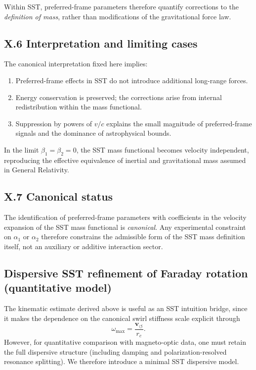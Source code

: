 \documentclass[10pt]{article}
\begin{document}
        Within SST, preferred-frame parameters therefore quantify corrections to the
        \emph{definition of mass}, rather than modifications of the gravitational
        force law.

    \subsection*{X.6 Interpretation and limiting cases}

        The canonical interpretation fixed here implies:
        \begin{enumerate}
            \item Preferred-frame effects in SST do not introduce additional long-range
            forces.
            \item Energy conservation is preserved; the corrections arise from internal
            redistribution within the mass functional.
            \item Suppression by powers of $v/c$ explains the small magnitude of
            preferred-frame signals and the dominance of astrophysical bounds.
        \end{enumerate}

        In the limit $\beta_1 = \beta_2 = 0$, the SST mass functional becomes
        velocity independent, reproducing the effective equivalence of inertial and
        gravitational mass assumed in General Relativity.

    \subsection*{X.7 Canonical status}

        The identification of preferred-frame parameters with coefficients in the
        velocity expansion of the SST mass functional is \emph{canonical}.
        Any experimental constraint on $\alpha_1$ or $\alpha_2$ therefore constrains
        the admissible form of the SST mass definition itself, not an auxiliary or
        additive interaction sector.

    \subsection{Dispersive SST refinement of Faraday rotation (quantitative model)}
        
        The kinematic estimate derived above is useful as an SST intuition bridge, since it makes the dependence on the canonical swirl stiffness scale explicit through
        \[
            \omega_{\max}=\frac{\mathbf{v}_{\!\boldsymbol{\circlearrowleft}}}{r_c}.
        \]
        However, for quantitative comparison with magneto-optic data, one must retain the full dispersive structure (including damping and polarization-resolved resonance splitting). We therefore introduce a minimal SST dispersive model.
        
\end{document}
